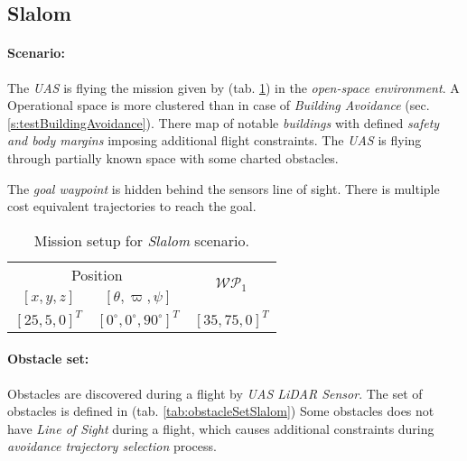 \newpage
\subsection{Slalom}\label{s:testSlalom}

\paragraph{Scenario:} The \emph{UAS} is flying the mission given by (tab. \ref{tab:missionSetupSlalomScenario}) in the \emph{open-space environment}. A Operational space is more clustered than in case of \emph{Building Avoidance} (sec. \ref{s:testBuildingAvoidance}). There map of notable \emph{buildings} with defined \emph{safety and body margins} imposing additional flight constraints. The \emph{UAS} is flying through partially known space with some charted obstacles. 

The \emph{goal waypoint} is hidden behind the sensors line of sight. There is multiple cost equivalent trajectories to reach the goal. 

\begin{table}[H]
    \centering
    \begin{tabular}{c|c||c}
        \multicolumn{2}{c||}{Position} & \multirow{2}{*}{$\mathscr{WP}_1$} \\\cline{1-2}
        $[x,y,z]$           & $[\theta,\varpi,\psi]$           & \\\hline\hline
        $[25,5,0]^T $        & $[0^\circ,0^\circ,90^\circ]^T$    & $[35,75,0]^T$        \\ 
    \end{tabular}
    \caption{Mission setup for \emph{Slalom} scenario.}
    \label{tab:missionSetupSlalomScenario}
\end{table}

\paragraph{Obstacle set:} Obstacles are discovered during a flight by \emph{UAS LiDAR Sensor}. The set of obstacles is defined in (tab. \ref{tab:obstacleSetSlalom}) Some obstacles does not have \emph{Line of Sight} during a flight, which causes additional constraints during \emph{avoidance trajectory selection} process.

